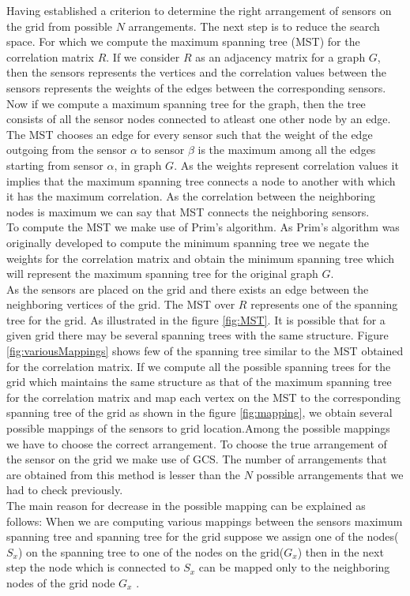 Having established a criterion to determine the right arrangement of sensors on the grid from  possible ${N}$ arrangements. The next step is to reduce the search space. For which we compute the maximum spanning tree (MST) for the correlation matrix ${R}$. 
If we consider ${R}$ as an adjacency matrix for a graph ${G}$, then the sensors represents the vertices and the correlation values between the sensors represents the weights of the edges between the corresponding sensors.
Now if we compute a maximum spanning tree for the graph, then the tree consists of all the sensor nodes connected to atleast one other node by an edge. The MST chooses an edge for every sensor such that the weight of the edge outgoing from the sensor $\alpha$ to sensor $\beta$ is the maximum among all the edges starting from sensor $\alpha$, in graph ${G}$. As the weights represent correlation values it implies that the maximum spanning tree connects a node to another with which it has the maximum correlation. As the correlation between the neighboring nodes is maximum we can say that MST connects the neighboring sensors.\\
 To compute the MST we make use of Prim's algorithm\cite{BLTJ:BLTJ1515}. As Prim's algorithm was originally developed to compute the minimum spanning tree we negate the weights for the correlation matrix and obtain the minimum spanning tree which will represent the maximum spanning tree for the original graph ${G}$. \\
As the sensors are placed on the grid and there exists an edge between the neighboring vertices of the grid. The MST over ${R}$ represents one of the spanning tree for the grid. As illustrated in the figure \ref{fig:MST}.
It is possible that for a given grid there may be several spanning trees with the same structure. 
Figure \ref{fig:variousMappings} shows few of the spanning tree similar to the MST obtained for the correlation matrix.
If we compute all the possible spanning trees for the grid which maintains the same structure as that of the maximum spanning tree for the correlation matrix and map each vertex on the MST to the corresponding spanning tree of the grid as shown in the figure \ref{fig:mapping}, we obtain several possible mappings of the sensors to grid location.Among the possible mappings we have to choose the correct arrangement. To choose the true arrangement of the sensor on the grid we make use of  GCS. The number of arrangements that are obtained from this method is lesser than the ${N}$  possible arrangements that we had to check previously. \\
The main reason for decrease in the possible mapping can be explained as follows:
When we are computing various mappings between the sensors maximum spanning tree and spanning tree for the grid suppose we assign one of the nodes($S_x$) on the  spanning tree to one of the nodes on the grid($G_x$) then in the next step the node which is connected to $S_x$ can be mapped only to the neighboring nodes of the grid node $G_x$ .









